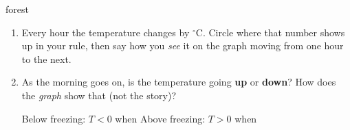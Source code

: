 \documentclass[12pt]{article}
\newcommand{\answerspace}[2]{\par\nopagebreak\noindent\begin{minipage}[t][#1][t]{\linewidth}%
  \color{keyred}\bfseries #2\end{minipage}\par}
\begin{document}
\begin{scenariobox}{forest}
\begin{enumerate}[label=\textbf{\alph*.}, start=5, leftmargin=1.8em, itemsep=4pt]
  \item Every hour the temperature changes by \blank{1.2cm} $^\circ$C. Circle where that number
        shows up in your rule, then say how you \emph{see} it on the graph moving from one hour
        to the next.
        \answerspace{1.8cm}{}
  \item As the morning goes on, is the temperature going \textbf{up} or \textbf{down}? How does
        the \emph{graph} show that (not the story)?
        \answerspace{1.3cm}{}
        Below freezing: $T<0$ when \blank{2.6cm} \qquad
        Above freezing: $T>0$ when \blank{2.6cm}
\end{enumerate}
\end{scenariobox}
\end{document}
